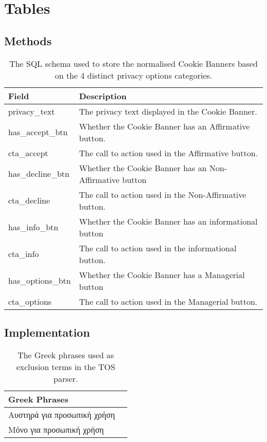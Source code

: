 \documentclass[../main.tex]{subfiles}
\begin{document}
\section{Tables}

\subsection*{Methods}
\begin{table}[ht]
    \centering
    \begin{tabular}{@{}ll@{}}
    \toprule
        \textbf{Field}    & \textbf{Description}                                    \\ \midrule
        privacy\_text     & The privacy text displayed in the Cookie Banner.        \\
        has\_accept\_btn  & Whether the Cookie Banner has an Affirmative button.    \\
        cta\_accept       & The call to action used in the Affirmative button.      \\
        has\_decline\_btn & Whether the Cookie Banner has an Non-Affirmative button \\
        cta\_decline      & The call to action used in the Non-Affirmative button.  \\
        has\_info\_btn    & Whether the Cookie Banner has an informational button   \\
        cta\_info         & The call to action used in the informational button.    \\
        has\_options\_btn & Whether the Cookie Banner has a Managerial button       \\
        cta\_options      & The call to action used in the Managerial button.       \\ \bottomrule
    \end{tabular}
    \caption{The SQL schema used to store the normalised Cookie Banners based on the 4 distinct privacy options categories.}
    \label{tab:methods_normalised_schema}
\end{table}

\subsection*{Implementation}
\begin{table}[ht]
    \centering
    \begin{tabular}{@{}ll@{}}
        \toprule
        \textbf{Greek Phrases}       \\ \midrule
        Αυστηρά για προσωπική χρήση  \\
        Μόνο για προσωπική χρήση     \\ \bottomrule
    \end{tabular}
    \caption{The Greek phrases used as exclusion terms in the TOS parser.}
    \label{tab:impl_greek_exclusion_terms}
\end{table}
\end{document}
